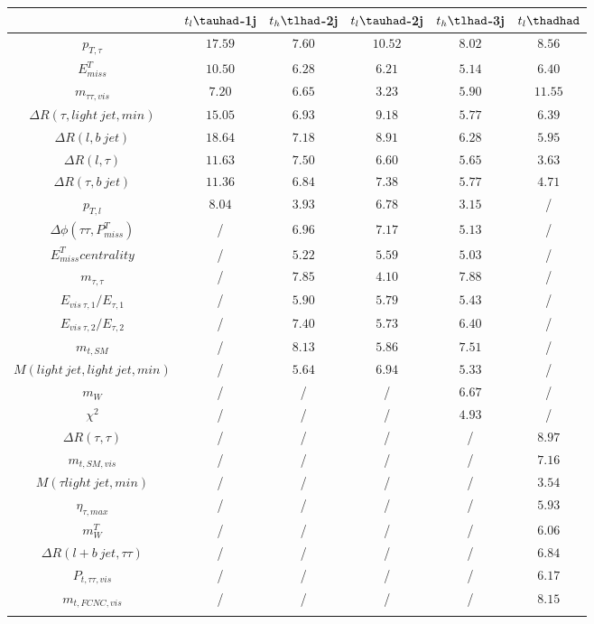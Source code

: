 \centering
\begin{tabular}{cccccc} \toprule\toprule
 & $t_{l}\tauhad$-1j & $t_{h}\tlhad$-2j & $t_{l}\tauhad$-2j & $t_{h}\tlhad$-3j & $t_l\thadhad$\\\midrule
$p_{T,\tau }$ & $17.59$ & $7.60$ & $10.52$ & $8.02$ & $8.56$\\
$E^{T}_{miss}$ & $10.50$ & $6.28$ & $6.21$ & $5.14$ & $6.40$\\
$m_{\tau \tau ,vis}$ & $7.20$ & $6.65$ & $3.23$ & $5.90$ & $11.55$\\
$\Delta R(\tau ,light~jet,min)$ & $15.05$ & $6.93$ & $9.18$ & $5.77$ & $6.39$\\
$\Delta R(l,b~jet)$ & $18.64$ & $7.18$ & $8.91$ & $6.28$ & $5.95$\\
$\Delta R(l,\tau )$ & $11.63$ & $7.50$ & $6.60$ & $5.65$ & $3.63$\\
$\Delta R(\tau ,b~jet)$ & $11.36$ & $6.84$ & $7.38$ & $5.77$ & $4.71$\\
$p_{T,l}$ & $8.04$ & $3.93$ & $6.78$ & $3.15$ &  /\\
$\Delta\phi(\tau \tau ,P^{T}_{miss})$ &  / & $6.96$ & $7.17$ & $5.13$ &  /\\
$E^{T}_{miss} centrality$ &  / & $5.22$ & $5.59$ & $5.03$ &  /\\
$m_{\tau ,\tau }$ &  / & $7.85$ & $4.10$ & $7.88$ &  /\\
$E_{vis~\tau ,1}/E_{\tau ,1}$ &  / & $5.90$ & $5.79$ & $5.43$ &  /\\
$E_{vis~\tau ,2}/E_{\tau ,2}$ &  / & $7.40$ & $5.73$ & $6.40$ &  /\\
$m_{t,SM}$ &  / & $8.13$ & $5.86$ & $7.51$ &  /\\
$M(light~jet,light~jet,min)$ &  / & $5.64$ & $6.94$ & $5.33$ &  /\\
$m_{W}$ &  / &  / &  / & $6.67$ &  /\\
$\chi^{2}$ &  / &  / &  / & $4.93$ &  /\\
$\Delta R(\tau ,\tau )$ &  / &  / &  / &  / & $8.97$\\
$m_{t,SM,vis}$ &  / &  / &  / &  / & $7.16$\\
$M(\tau  light~jet,min)$ &  / &  / &  / &  / & $3.54$\\
$\eta_{\tau ,max}$ &  / &  / &  / &  / & $5.93$\\
$m^{T}_{W}$ &  / &  / &  / &  / & $6.06$\\
$\Delta R(l+b~jet,\tau \tau )$ &  / &  / &  / &  / & $6.84$\\
$P_{t,\tau \tau ,vis}$ &  / &  / &  / &  / & $6.17$\\
$m_{t,FCNC,vis}$ &  / &  / &  / &  / & $8.15$\\
\bottomrule\bottomrule\\
\end{tabular}
